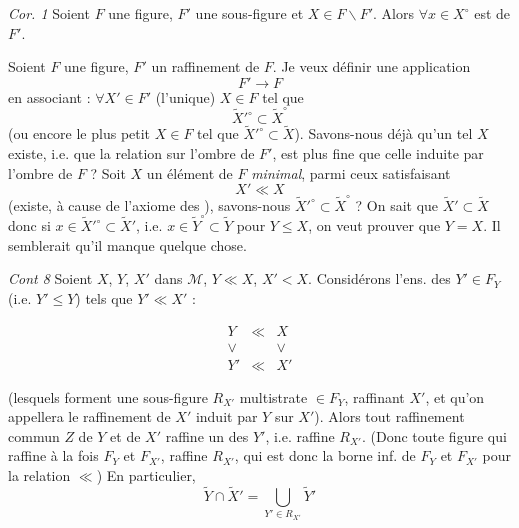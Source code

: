\documentclass[11pt,a4paper]{article}
\begin{document}
\emph{Cor. 1} \quad Soient $F$ une figure, $F'$ une sous-figure et $X \in F \smallsetminus F'$. Alors $\forall x \in X^{\circ}$ est   de $F'$.


Soient $F$ une figure,  $F'$ un raffinement  de $F$. Je veux définir une application
\[
  F' \to F
\]
en associant : $\forall X' \in F'$ (l'unique) $X \in F$ tel que
\[
  \widetilde{X}'^{\circ} \subset \widetilde{X}^{\circ}
\]
(ou encore le plus petit $X \in F$ tel que $\widetilde{X}'^{\circ} \subset \widetilde{X}$). Savons-nous déjà qu'un tel $X$ existe, i.e. que la relation  \ill{} sur l'ombre de $F'$, est plus fine que celle induite par l'ombre de $F$ ? Soit $X$ un élément de $F$ \emph{minimal}, parmi ceux satisfaisant
\[
  X' \ll X
\]
(existe, à cause de l'axiome des ), savons-nous  $\widetilde{X}'^{\circ} \subset \widetilde{X}^{\circ}$ ?  On sait que $\widetilde{X}' \subset \widetilde{X}$ donc si $x \in \widetilde{X}'^{\circ} \subset \widetilde{X}'$, i.e. $x \in \widetilde{Y}^{\circ} \subset \widetilde{Y}$ pour $Y \leq X$, on veut prouver que $Y = X$. Il semblerait qu'il manque quelque chose.

\emph{Cont 8} \quad Soient $X$, $Y$, $X'$ dans $\mathcal{M}$, $Y \ll X$, $X' < X$. Considérons l'ens. des $Y' \in F_Y$ (i.e. $Y' \leq Y$) tels que $Y' \ll X'$ :

\[
  \begin{array}{ccc}
    Y & \ll & X \\
    \vee & & \vee \\
    Y' & \ll & X'
  \end{array}
\]

(lesquels forment une sous-figure $R_{X'}$ \ill{} multistrate $\in F_Y$,  raffinant $X'$, et qu'on appellera le raffinement de $X'$ induit par $Y$ sur $X'$). Alors tout raffinement commun $Z$ de $Y$ et de $X'$ raffine un des $Y'$, i.e. raffine $R_{X'}$. (Donc toute figure qui raffine à la fois $F_Y$ et $F_{X'}$, raffine $R_{X'}$, qui est donc   la borne inf. de $F_Y$ et $F_{X'}$ pour la relation $\ll$) En particulier,
\[
  \widetilde{Y} \cap \widetilde{X}' = \bigcup_{Y' \in R_{X'}} \widetilde{Y}'
\]
\end{document}
